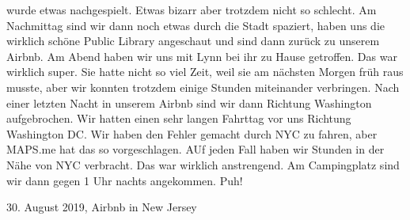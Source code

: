 \documentclass[11pt]{book}
\begin{document}
wurde etwas nachgespielt. Etwas bizarr aber trotzdem nicht so schlecht. Am Nachmittag sind wir dann noch etwas durch die Stadt spaziert, haben uns die wirklich 
schöne Public Library angeschaut und sind dann zurück zu unserem Airbnb. Am Abend haben wir uns mit Lynn bei ihr zu Hause getroffen. Das war wirklich super. 
Sie hatte nicht so viel Zeit, weil sie am nächsten Morgen früh raus musste, aber wir konnten trotzdem einige Stunden miteinander verbringen. Nach einer letzten 
Nacht in unserem Airbnb sind wir dann Richtung Washington aufgebrochen. Wir hatten einen sehr langen Fahrttag vor uns Richtung Washington DC. Wir haben 
den Fehler gemacht durch NYC zu fahren, aber MAPS.me hat das so vorgeschlagen. AUf jeden Fall haben wir Stunden in der Nähe von NYC verbracht. Das war wirklich 
anstrengend. Am Campingplatz sind wir dann gegen 1 Uhr nachts angekommen. Puh! 


30. August 2019, Airbnb in New Jersey
\end{document}
